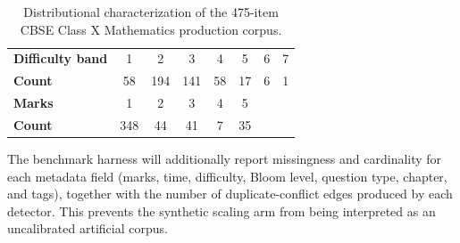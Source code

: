 \documentclass[runningheads]{llncs}
\begin{document}
\begin{table}[t]
\caption{Distributional characterization of the 475-item CBSE Class X Mathematics production corpus.}
\label{tab:dataset}
\centering
\small
\begin{tabular}{lccccccc}
\toprule
\textbf{Difficulty band} & 1 & 2 & 3 & 4 & 5 & 6 & 7 \\
\textbf{Count} & 58 & 194 & 141 & 58 & 17 & 6 & 1 \\
\midrule
\textbf{Marks} & 1 & 2 & 3 & 4 & 5 & & \\
\textbf{Count} & 348 & 44 & 41 & 7 & 35 & & \\
\bottomrule
\end{tabular}
\end{table}

\noindent The benchmark harness will additionally report missingness and cardinality for each metadata field (marks, time, difficulty, Bloom level, question type, chapter, and tags), together with the number of duplicate-conflict edges produced by each detector. This prevents the synthetic scaling arm from being interpreted as an uncalibrated artificial corpus.
\end{document}
